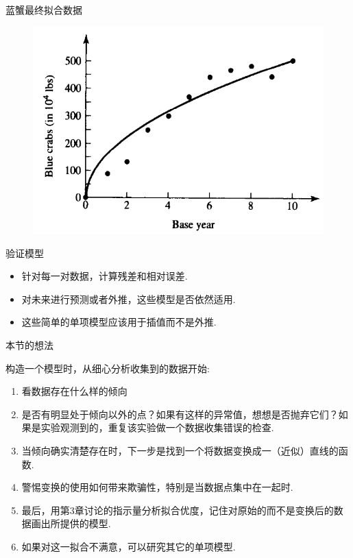 \documentclass[UTF8]{ctexbeamer}
\begin{document}
\begin{frame}{蓝蟹最终拟合数据}

  \begin{figure}
    \centering
    \includegraphics[height=.6\textheight{}]{bluecrab-fit.png}
  \end{figure}
  
\end{frame}

\begin{frame}{验证模型}

  \begin{itemize}
  \item 针对每一对数据，计算残差和相对误差.
  \item 对未来进行预测或者外推，这些模型是否依然适用.
  \item 这些简单的单项模型应该用于插值而不是外推.
  \end{itemize}
  
\end{frame}

\begin{frame}{本节的想法}


  构造一个模型时，从细心分析收集到的数据开始:
    \begin{enumerate}
    \item 看数据存在什么样的倾向
    \item 是否有明显处于倾向以外的点？如果有这样的异常值，想想是否抛弃它们？如果是实验观测到的，重复该实验做一个数据收集错误的检查.
    \item 当倾向确实清楚存在时，下一步是找到一个将数据变换成一（近似）直线的函数.
    \item 警惕变换的使用如何带来欺骗性，特别是当数据点集中在一起时.
    \item 最后，用第3章讨论的指示量分析拟合优度，记住对原始的而不是变换后的数据画出所提供的模型.
    \item 如果对这一拟合不满意，可以研究其它的单项模型.
    \end{enumerate}
  
\end{frame}
\end{document}
